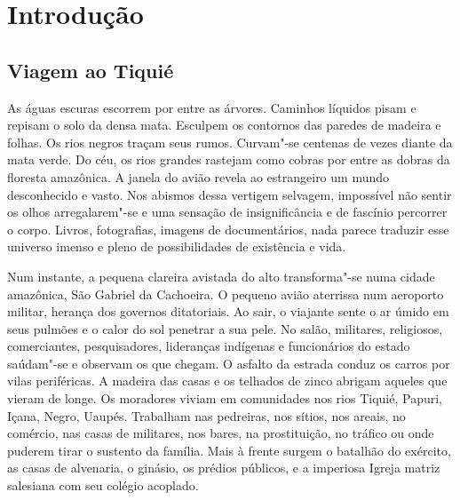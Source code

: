 \chapter*{Introdução\smallskip{}}

\setlength{\epigraphwidth}{.40\textwidth}
\begin{epigraphs} 
\end{epigraphs}

\section{Viagem ao Tiquié}\label{viagem-ao-tiquiuxe9}

As águas escuras escorrem por entre as árvores. Caminhos líquidos pisam
e repisam o solo da densa mata. Esculpem os contornos das paredes de
madeira e folhas. Os rios negros traçam seus rumos. Curvam"-se centenas
de vezes diante da mata verde. Do céu, os rios grandes rastejam como
cobras por entre as dobras da floresta amazônica. A janela do avião
revela ao estrangeiro um mundo desconhecido e vasto. Nos abismos dessa
vertigem selvagem, impossível não sentir os olhos arregalarem"-se e uma
sensação de insignificância e de fascínio percorrer o corpo. Livros,
fotografias, imagens de documentários, nada parece traduzir esse
universo imenso e pleno de possibilidades de existência e vida.

Num instante, a pequena clareira avistada do alto transforma"-se numa
cidade amazônica, São Gabriel da Cachoeira. O pequeno avião aterrissa
num aeroporto militar, herança dos governos ditatoriais. Ao sair, o
viajante sente o ar úmido em seus pulmões e o calor do sol penetrar a
sua pele. No salão, militares, religiosos, comerciantes, pesquisadores,
lideranças indígenas e funcionários do estado saúdam"-se e observam os
que chegam. O asfalto da estrada conduz os carros por vilas periféricas.
A madeira das casas e os telhados de zinco abrigam aqueles que vieram de
longe. Os moradores viviam em comunidades nos rios Tiquié, Papuri,
Içana, Negro, Uaupés. Trabalham nas pedreiras, nos sítios, nos areais,
no comércio, nas casas de militares, nos bares, na prostituição, no
tráfico ou onde puderem tirar o sustento da família. Mais à frente
surgem o batalhão do exército, as casas de alvenaria, o ginásio, os
prédios públicos, e a imperiosa Igreja matriz salesiana com seu colégio
acoplado.

